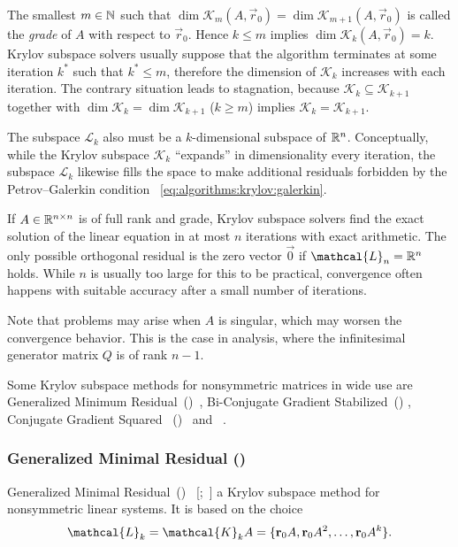 The smallest $m \in \mathbb{N}$ such that
$\dim \mathcal{K}_m(A, \vec{r}_0) = \dim \mathcal{K}_{m + 1}(A,
\vec{r}_0)$
is called the \emph{grade} of $A$ with respect to $\vec{r}_0$. Hence
$k \le m$ implies $\dim \mathcal{K}_k(A, \vec{r}_0) = k$. Krylov
subspace solvers usually suppose that the algorithm terminates at some
iteration $k^*$ such that $k^* \le m$, therefore the dimension of
$\mathcal{K}_k$ increases with each iteration. The contrary situation
leads to stagnation, because
$\mathcal{K}_k \subseteq \mathcal{K}_{k + 1}$ together with
$\dim \mathcal{K}_k = \dim \mathcal{K}_{k + 1}$ ($k \ge m$) implies
$\mathcal{K}_k = \mathcal{K}_{k + 1}$.

The subspace $\mathcal{L}_k$ also must be a $k$-dimensional subspace
of $\mathbb{R}^n$. Conceptually, while the Krylov subspace $\mathcal{K}_k$
``expands'' in dimensionality every iteration, the subspace
$\mathcal{L}_k$ likewise fills the space to make additional residuals
forbidden by the Petrov--Galerkin condition~%
\eqref{eq:algorithms:krylov:galerkin}.

If $A \in \mathbb{R}^{n \times n}$ is of full rank and grade, Krylov subspace
solvers find the exact solution of the linear equation in at most $n$
iterations with exact arithmetic. The only possible orthogonal
residual is the zero vector $\vec{0}$ if $\mathcal{L}_n = \RR^n$
holds. While $n$ is usually too large for this to be practical,
convergence often happens with suitable accuracy after a small number
of iterations.

Note that problems may arise when $A$ is singular, which may worsen
the convergence behavior. This is the case in  analysis,
where the infinitesimal generator matrix $Q$ is of rank $n - 1$.

Some Krylov subspace methods for nonsymmetric matrices in wide use are
Generalized Minimum Residual~()~\citep{saad1986gmres},
Bi-Conjugate Gradient Stabilized~()
\citep{van1992bi}, Conjugate Gradient Squared%
~()~\citep{sonneveld1989cgs} and
~\citep{sonneveld2008idr}.

\subsubsection{Generalized Minimal Residual ()}
\label{ssec:algorithms:gmres}

Generalized Minimal Residual~()%
~\mkbibbrackets{;~}
a Krylov subspace method for nonsymmetric linear systems. It is based
on the choice
\begin{equation}
  \label{eq:algorithms:gmres:lspace}
  \mathcal{L}_k = \mathcal{K}_k A = \{ \vec{r}_0A, \vec{r}_0A^2,
  \ldots, \vec{r}_0 A^k \} \text.
\end{equation}

